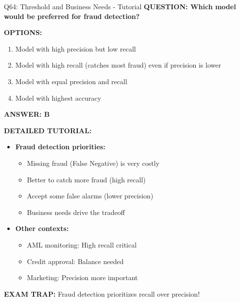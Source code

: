 \documentclass[8pt]{beamer}
\begin{document}
	\begin{frame}{Q64: Threshold and Business Needs - Tutorial}
		\fontsize{6.5}{7.5}\selectfont
		\textbf{QUESTION: Which model would be preferred for fraud detection?}
		
		\vspace{0.1cm}
		\textbf{OPTIONS:}
		\begin{enumerate}
			\item Model with high precision but low recall
			\item Model with high recall (catches most fraud) even if precision is lower
			\item Model with equal precision and recall
			\item Model with highest accuracy
		\end{enumerate}
		
		\vspace{0.1cm}
		\textcolor{myblue}{\textbf{ANSWER: B}}
		
		\vspace{0.1cm}
		\textbf{DETAILED TUTORIAL:}
		\begin{itemize}
			\item \textbf{Fraud detection priorities:}
			\begin{itemize}
				\item Missing fraud (False Negative) is very costly
				\item Better to catch more fraud (high recall)
				\item Accept some false alarms (lower precision)
				\item Business needs drive the tradeoff
			\end{itemize}
			\item \textbf{Other contexts:}
			\begin{itemize}
				\item AML monitoring: High recall critical
				\item Credit approval: Balance needed
				\item Marketing: Precision more important
			\end{itemize}
		\end{itemize}
		
		\textcolor{myred}{\textbf{EXAM TRAP:}} Fraud detection prioritizes \textcolor{myblue}{recall over precision}!
	\end{frame}
	
\end{document}

